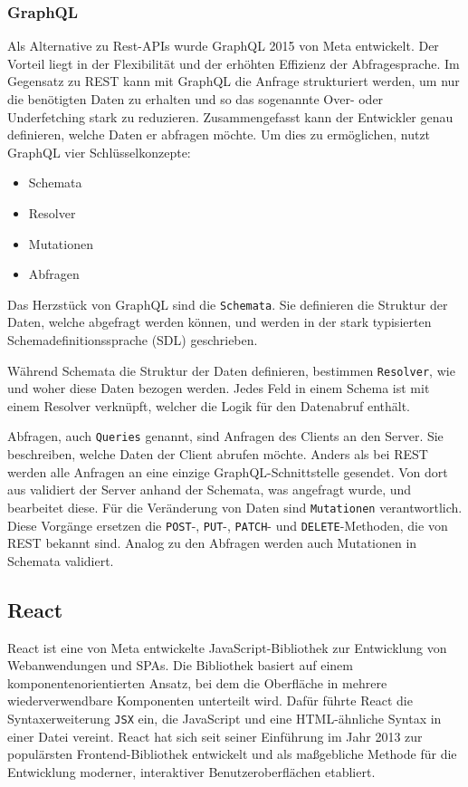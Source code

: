 \subsubsection{GraphQL} \label{sec:graphql}
Als Alternative zu \gls{Rest-API}s wurde GraphQL 2015 von Meta entwickelt. Der Vorteil liegt in der Flexibilität und der erhöhten Effizienz der Abfragesprache. Im Gegensatz zu REST kann mit GraphQL die Anfrage strukturiert werden, um nur die benötigten
Daten zu erhalten und so das sogenannte Over- oder Underfetching stark zu reduzieren. Zusammengefasst kann der Entwickler genau definieren, welche Daten er abfragen möchte. Um dies zu ermöglichen, nutzt GraphQL vier Schlüsselkonzepte:
\begin{itemize}
  \item Schemata
  \item Resolver
  \item Mutationen
  \item Abfragen
\end{itemize}
Das Herzstück von GraphQL sind die \texttt{Schemata}. Sie definieren die Struktur der Daten, welche abgefragt werden können, und werden in der stark typisierten Schemadefinitionssprache (SDL) geschrieben.

Während Schemata die Struktur der Daten definieren, bestimmen \texttt{Resolver}, wie und woher diese Daten bezogen werden. Jedes Feld in einem Schema ist mit einem Resolver verknüpft, welcher die Logik für den Datenabruf enthält.

Abfragen, auch \texttt{Queries} genannt, sind Anfragen des Clients an den Server. Sie beschreiben, welche Daten der Client abrufen möchte. Anders als bei REST werden alle Anfragen an eine einzige GraphQL-Schnittstelle gesendet. Von dort aus validiert der Server
anhand der Schemata, was angefragt wurde, und bearbeitet diese.
Für die Veränderung von Daten sind \texttt{Mutationen} verantwortlich. Diese Vorgänge ersetzen die \texttt{POST}-, \texttt{PUT}-, \texttt{PATCH}- und \texttt{DELETE}-Methoden, die von REST bekannt sind. Analog zu den Abfragen werden auch Mutationen in Schemata validiert.
\cite{ibm_graphql_2024}
\subsection{React}
React ist eine von Meta entwickelte JavaScript-\gls{Bibliothek} zur Entwicklung von Webanwendungen und \glspl{SPA}. Die Bibliothek basiert auf einem komponentenorientierten Ansatz, bei dem die Oberfläche in mehrere wiederverwendbare Komponenten unterteilt wird. Dafür
führte React die Syntaxerweiterung \texttt{JSX} ein, die JavaScript und eine HTML-ähnliche Syntax in einer Datei vereint. React hat sich seit seiner Einführung im Jahr 2013 zur populärsten Frontend-Bibliothek entwickelt und als maßgebliche Methode für die Entwicklung moderner,
interaktiver Benutzeroberflächen etabliert.
